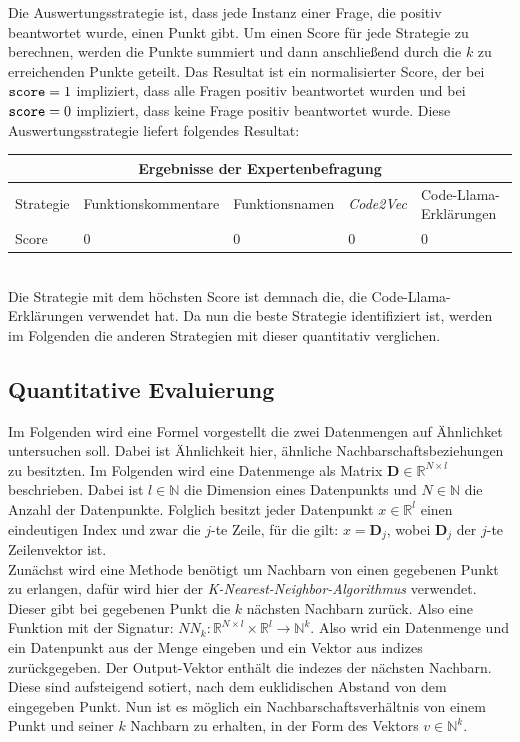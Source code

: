 \documentclass[12pt,letterpaper,ngerman]{article}
\begin{document}
Die Auswertungsstrategie ist, dass jede Instanz einer Frage, die positiv
beantwortet wurde, einen Punkt gibt. Um einen Score für jede Strategie
zu berechnen, werden die Punkte summiert und dann anschließend durch die
$k$ zu erreichenden Punkte geteilt. Das Resultat ist ein normalisierter 
Score, der bei $\verb|score| = 1$ impliziert, dass alle Fragen positiv 
beantwortet wurden und bei $\verb|score| = 0$ impliziert, dass keine 
Frage positiv beantwortet wurde. Diese Auswertungsstrategie liefert 
folgendes Resultat:
\begin{center}
  \begin{tabular}{ |p{1.3cm}||p{3.8cm}|p{3cm}|p{1.8cm}|p{4.5cm}|  }
  \hline
  \multicolumn{5}{|c|}{Ergebnisse der Expertenbefragung} \\
  \hline
  Strategie & Funktionskommentare &  Funktionsnamen & \textit{Code2Vec} & Code-Llama-Erklärungen\\
  \hline
  Score   &  0                    &        0        &   0               & 0\\
  \hline
  \end{tabular}
\end{center} 
\hfill\\
Die Strategie mit dem höchsten Score ist demnach die, die Code-Llama-Erklärungen
verwendet hat. Da nun die beste Strategie identifiziert ist, 
werden im Folgenden die anderen Strategien mit dieser quantitativ verglichen.
\subsection{Quantitative Evaluierung} 
Im Folgenden wird eine Formel vorgestellt die zwei Datenmengen
auf Ähnlichket untersuchen soll. Dabei ist Ähnlichkeit hier,
ähnliche Nachbarschaftsbeziehungen zu besitzten. Im Folgenden
wird eine Datenmenge als Matrix 
$\mathbf{D} \in \mathbb{R}^{N\times l}$ beschrieben. Dabei 
ist $l \in \mathbb{N}$ die Dimension eines Datenpunkts und
$N \in \mathbb{N}$ die Anzahl der Datenpunkte. Folglich
besitzt jeder Datenpunkt $x \in \mathbb{R}^l$ einen eindeutigen
Index und zwar die $j$-te Zeile, für die gilt: $x = \mathbf{D}_j$, 
wobei $\mathbf{D}_j$ der $j$-te Zeilenvektor ist.\\
Zunächst wird eine Methode benötigt um Nachbarn von einen gegebenen
Punkt zu erlangen, dafür wird hier der 
\textit{K-Nearest-Neighbor-Algorithmus} verwendet. Dieser
gibt bei gegebenen Punkt die $k$ nächsten Nachbarn zurück. 
Also eine Funktion mit der Signatur: 
$NN_k: \mathbb{R}^{N\times l} \times \mathbb{R}^{l} \to \mathbb{N}^k$. 
Also wrid ein Datenmenge und ein Datenpunkt aus der Menge eingeben
und ein Vektor aus indizes zurückgegeben.
Der Output-Vektor enthält die indezes der nächsten Nachbarn. Diese sind 
aufsteigend sotiert, nach dem euklidischen Abstand von dem eingegeben
Punkt. Nun ist es möglich ein Nachbarschaftsverhältnis von einem Punkt
und seiner $k$ Nachbarn zu erhalten, in der Form des Vektors 
$v \in \mathbb{N}^k$.
\end{document}

